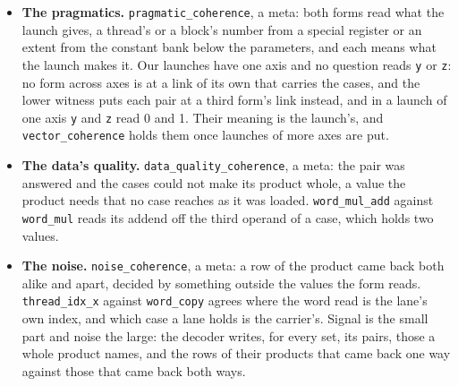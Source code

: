 \begin{itemize}
\item \textbf{The pragmatics.} \texttt{pragmatic\_\allowbreak{}coherence}, a meta: both forms read what the launch gives, a thread's or a block's number from a special register or an extent from the constant bank below the parameters, and each means what the launch makes it. Our launches have one axis and no question reads \texttt{y} or \texttt{z}: no form across axes is at a link of its own that carries the cases, and the lower witness puts each pair at a third form's link instead, and in a launch of one axis \texttt{y} and \texttt{z} read 0 and 1. Their meaning is the launch's, and \texttt{vector\_\allowbreak{}coherence} holds them once launches of more axes are put.
\item \textbf{The data's quality.} \texttt{data\_\allowbreak{}quality\_\allowbreak{}coherence}, a meta: the pair was answered and the cases could not make its product whole, a value the product needs that no case reaches as it was loaded. \texttt{word\_\allowbreak{}mul\_\allowbreak{}add} against \texttt{word\_\allowbreak{}mul} reads its addend off the third operand of a case, which holds two values.
\item \textbf{The noise.} \texttt{noise\_\allowbreak{}coherence}, a meta: a row of the product came back both alike and apart, decided by something outside the values the form reads. \texttt{thread\_\allowbreak{}idx\_\allowbreak{}x} against \texttt{word\_\allowbreak{}copy} agrees where the word read is the lane's own index, and which case a lane holds is the carrier's. Signal is the small part and noise the large: the decoder writes, for every set, its pairs, those a whole product names, and the rows of their products that came back one way against those that came back both ways.

\end{itemize}
